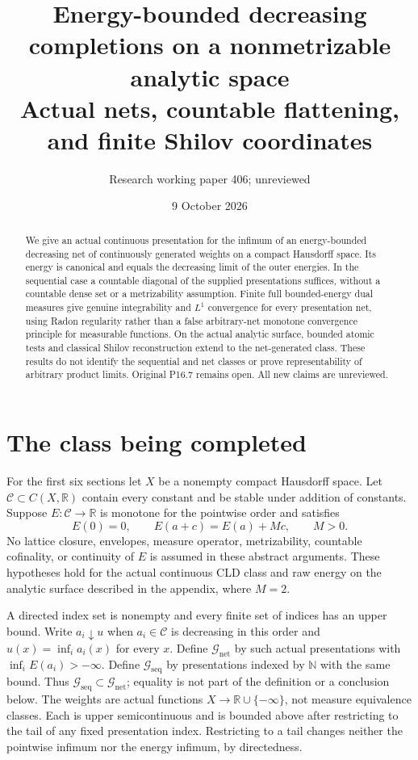 \documentclass[11pt]{article}
\title{Energy-bounded decreasing completions on a nonmetrizable analytic space\\Actual nets, countable flattening, and finite Shilov coordinates}
\author{Research working paper 406; unreviewed}
\date{9 October 2026}
\newcommand{\C}{\mathcal C}
\newcommand{\GN}{\mathcal G_{\mathrm{net}}}
\newcommand{\GS}{\mathcal G_{\mathrm{seq}}}
\newcommand{\RR}{\mathbb R}
\theoremstyle{remark}\newtheorem{remark}[theorem]{Remark}
\begin{document}
\maketitle
\begin{abstract}
We give an actual continuous presentation for the infimum of an
energy-bounded decreasing net of continuously generated weights on
a compact Hausdorff space. Its energy is canonical and equals the
decreasing limit of the outer energies. In the sequential case a
countable diagonal of the supplied presentations suffices, without
a countable dense set or a metrizability assumption. Finite full
bounded-energy dual measures give genuine integrability and
$L^1$ convergence for every presentation net, using Radon
regularity rather than a false arbitrary-net monotone convergence
principle for measurable functions. On the actual analytic surface,
bounded atomic tests and classical Shilov reconstruction extend to
the net-generated class. These results do not identify the sequential
and net classes or prove representability of arbitrary product
limits. Original P16.7 remains open. All new claims are unreviewed.
\end{abstract}

\section{The class being completed}
For the first six sections let $X$ be a nonempty compact Hausdorff
space. Let $\C\subset C(X,\RR)$ contain every constant and be stable
under addition of constants. Suppose $E:\C\to\RR$ is monotone for
the pointwise order and satisfies
\[
 E(0)=0,\qquad E(a+c)=E(a)+Mc,\qquad M>0.
\]
No lattice closure, envelopes, measure operator, metrizability,
countable cofinality, or continuity of $E$ is assumed in these
abstract arguments. These hypotheses hold for the actual continuous
CLD class and raw energy on the analytic surface described in the
appendix, where $M=2$.

A directed index set is nonempty and every finite set of indices
has an upper bound. Write $a_i\downarrow u$ when $a_i\in\C$ is
decreasing in this order and $u(x)=\inf_i a_i(x)$ for every $x$.
Define $\GN$ by such actual presentations with
$\inf_iE(a_i)>-\infty$. Define $\GS$ by presentations indexed by
$\mathbb N$ with the same bound. Thus $\GS\subset\GN$; equality
is not part of the definition or a conclusion below. The weights
are actual functions $X\to\RR\cup\{-\infty\}$, not measure
equivalence classes. Each is upper semicontinuous and is bounded
above after restricting to the tail of any fixed presentation index.
Restricting to a tail changes neither the pointwise infimum nor
the energy infimum, by directedness.
\end{document}
